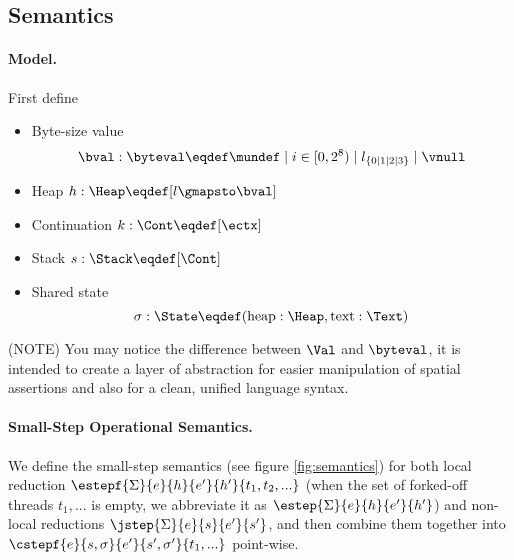 \subsection{Semantics}\label{sec:semantics}
\paragraph{Model.}

First define
\begin{itemize}
\item Byte-size value \[\bval : \byteval \eqdef \mundef \mid i \in [0, 2^8) \mid l_{\{0 \mid 1 \mid 2 \mid 3\}} \mid \vnull\]
\item Heap $h: \Heap \eqdef [ l \gmapsto \bval ]$
\item Continuation $k: \Cont \eqdef [\ectx]$
\item Stack $s: \Stack \eqdef [\Cont]$
\item Shared state \[\sigma: \State \eqdef (\text{heap}: \Heap, \text{text}: \Text)\]
\end{itemize}

(NOTE) You may notice the difference between $\Val$ and $\byteval$, it is intended to create a layer of abstraction for
easier manipulation of spatial assertions and also for a clean, unified language syntax.

\paragraph{Small-Step Operational Semantics.}

We define the small-step semantics (see figure \ref{fig:semantics}) for both
local reduction $\estepf{\Sigma}{e}{h}{e'}{h'}{t_1, t_2, ...}$
(when the set of forked-off threads $t_1, ...$ is empty, we abbreviate it as $\estep{\Sigma}{e}{h}{e'}{h'}$) and
non-local reductions $\jstep{\Sigma}{e}{s}{e'}{s'}$,
and then combine them together into $\cstepf{e}{s, \sigma}{e'}{s', \sigma'}{t_1, ...}$ point-wise.


